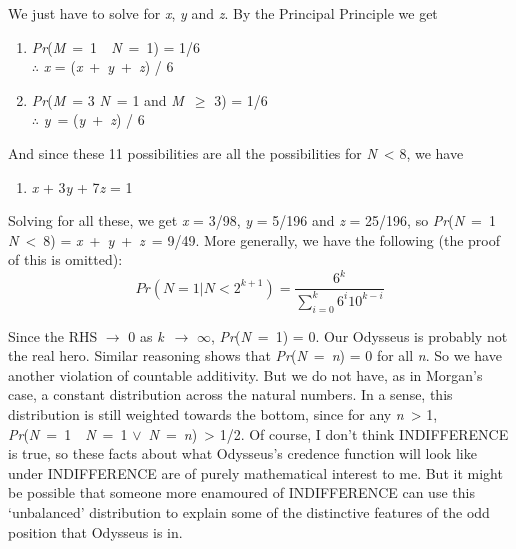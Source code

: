 \documentclass[
  11pt,
  letterpaper,
  DIV=11,
  numbers=noendperiod,
  oneside]{scrartcl}
\providecommand{\tightlist}{%
  \setlength{\itemsep}{0pt}\setlength{\parskip}{0pt}}\usepackage{longtable,booktabs,array}
\begin{document}
We just have to solve for \emph{x}, \emph{y} and \emph{z}. By the
Principal Principle we get

\begin{enumerate}
\def\labelenumi{\arabic{enumi}.}
\setcounter{enumi}{5}
\item
  \emph{Pr}(\emph{M}~=~1~~\emph{N}~=~1) = 1/6\\
  \({\therefore}\) \emph{x} = (\emph{x}~+~\emph{y}~+~\emph{z}) / 6
\item
  \emph{Pr}(\emph{M}~= 3 \emph{N}~= 1 and \emph{M}~\({\geq}\) 3) = 1/6\\
  \({\therefore}\) \emph{y}~= (\emph{y}~+~\emph{z}) / 6
\end{enumerate}

And since these 11 possibilities are all the possibilities for
\emph{N}~\textless{} 8, we have

\begin{enumerate}
\def\labelenumi{\arabic{enumi}.}
\setcounter{enumi}{7}
\tightlist
\item
  \emph{x} + 3\emph{y} + 7\emph{z} = 1
\end{enumerate}

Solving for all these, we get \emph{x} = 3/98, \emph{y} = 5/196 and
\emph{z} = 25/196, so \emph{Pr}(\emph{N}~=~1~ \emph{N}~\textless~8) =
\emph{x}~+~\emph{y}~+~\emph{z}~= 9/49. More generally, we have the
following (the proof of this is omitted):
\[Pr(N = 1 | N < 2^{k+1}) = \frac{6^k}{\sum_{i=0}^{k}6^i10^{k-i}}\]

Since the RHS \({\rightarrow}\) 0 as \emph{k}~\({\rightarrow}\)
\({\infty}\), \emph{Pr}(\emph{N}~=~1) = 0. Our Odysseus is probably not
the real hero. Similar reasoning shows that
\emph{Pr}(\emph{N}~=~\emph{n}) = 0 for all \emph{n}. So we have another
violation of countable additivity. But we do not have, as in Morgan's
case, a constant distribution across the natural numbers. In a sense,
this distribution is still weighted towards the bottom, since for any
\emph{n}~\textgreater{} 1, \emph{Pr}(\emph{N}~=~1~~\emph{N}~=~1
\({\vee}\)~\emph{N}~=~\emph{n})~\textgreater{} 1/2. Of course, I don't
think INDIFFERENCE is true, so these facts about what Odysseus's
credence function will look like under INDIFFERENCE are of purely
mathematical interest to me. But it might be possible that someone more
enamoured of INDIFFERENCE can use this `unbalanced' distribution to
explain some of the distinctive features of the odd position that
Odysseus is in.
\end{document}
